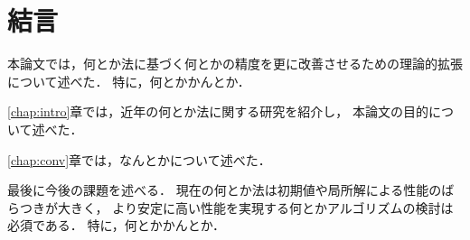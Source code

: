 \chapter{結言}
\label{chap:con}

本論文では，何とか法に基づく何とかの精度を更に改善させるための理論的拡張について述べた．
特に，何とかかんとか．

\ref{chap:intro}章では，近年の何とか法に関する研究を紹介し，
本論文の目的について述べた．

\ref{chap:conv}章では，なんとかについて述べた．

最後に今後の課題を述べる．
現在の何とか法は初期値や局所解による性能のばらつきが大きく，
より安定に高い性能を実現する何とかアルゴリズムの検討は必須である．
特に，何とかかんとか．